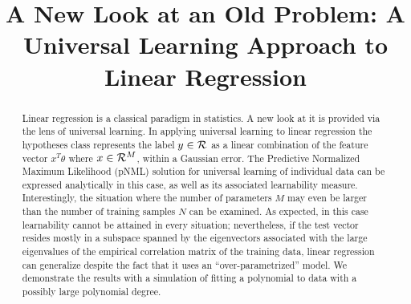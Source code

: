 \documentclass[conference,letterpaper]{IEEEtran}
\begin{document}
\title{A New Look at an Old Problem: A Universal Learning Approach to Linear Regression} 

\author{%
  \and
  \and
}


\maketitle

\begin{abstract}
Linear regression is a classical paradigm in statistics. 
A new look at it is provided via the lens of universal learning.
In applying universal learning to linear regression the hypotheses class represents the label $y\in {\cal R}$ as a linear combination of the feature vector $x^T\theta$ where $x\in {\cal R}^M$, within a Gaussian error.
The Predictive Normalized Maximum Likelihood (pNML) solution for universal learning of individual data can be expressed analytically in this case, as well as its associated learnability measure. 
Interestingly, the situation where the number of parameters $M$ may even be larger than the number of training samples $N$ can be examined. 
As expected, in this case learnability cannot be attained in every situation; nevertheless, if the test vector resides mostly in a subspace spanned by the eigenvectors associated with the large eigenvalues of the empirical correlation matrix of the training data, linear regression can generalize despite the fact that it uses an ``over-parametrized'' model. 
We demonstrate the results with a simulation of fitting a polynomial to data with a possibly large polynomial degree.
\end{abstract}
\end{document}
